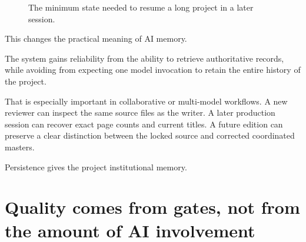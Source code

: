 \documentclass[11pt,oneside,openany]{book}
\begin{document}
\begin{figure}[htbp]
\centering
{}
\caption{The minimum state needed to resume a long project in a later session.}
\end{figure}

This changes the practical meaning of AI memory.

The system gains reliability from the ability to retrieve authoritative records, while avoiding from expecting one model invocation to retain the entire history of the project.

That is especially important in collaborative or multi-model workflows. A new reviewer can inspect the same source files as the writer. A later production session can recover exact page counts and current titles. A future edition can preserve a clear distinction between the locked source and corrected coordinated masters.

Persistence gives the project institutional memory.

\chapter{Quality comes from gates, not from the amount of AI involvement}\label{quality-comes-from-gates-not-from-the-amount-of-ai-involvement}
\end{document}
